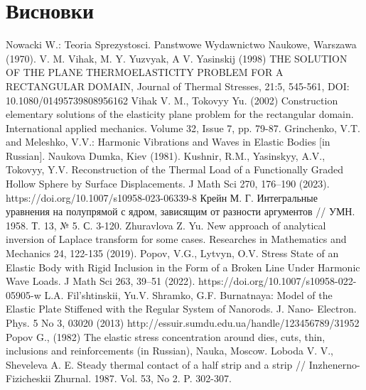 \documentclass[a4paper,14pt]{extarticle}
\numberwithin{equation}{section}
\begin{document}
\section*{\centering Висновки}

\newpage

\begin{thebibliography}{1}
    Nowacki W.: Teoria Sprezystosci. Panstwowe Wydawnictwo Naukowe, Warszawa (1970).
    V. M. Vihak, M. Y. Yuzvyak, A V. Yasinskij (1998) THE SOLUTION OF THE PLANE THERMOELASTICITY PROBLEM FOR A RECTANGULAR DOMAIN, Journal of Thermal Stresses, 21:5, 545-561, DOI: 10.1080/01495739808956162
    Vihak V. M., Tokovyy Yu. (2002) Construction elementary solutions of the elasticity plane problem for the rectangular domain. International applied mechanics. Volume 32, Issue 7, pp. 79-87.
    Grinchenko, V.T. and Meleshko, V.V.: Harmonic Vibrations and Waves in Elastic Bodies [in Russian]. Naukova Dumka, Kiev (1981).
    Kushnir, R.M., Yasinskyy, A.V., Tokovyy, Y.V. Reconstruction of the Thermal Load of a Functionally Graded Hollow Sphere by Surface Displacements. J Math Sci 270, 176–190 (2023). https://doi.org/10.1007/s10958-023-06339-8
    Крейн М. Г. Интегральные уравнения на полупрямой с ядром, зависящим от разности аргументов // УМН. 1958. Т. 13, № 5. С. 3-120.
    Zhuravlova Z. Yu. New approach of analytical inversion of Laplace transform for some cases. Researches in Mathematics and Mechanics 24, 122-135 (2019).
    Popov, V.G., Lytvyn, O.V. Stress State of an Elastic Body with Rigid Inclusion in the Form of a Broken Line Under Harmonic Wave Loads. J Math Sci 263, 39–51 (2022). https://doi.org/10.1007/s10958-022-05905-w
    L.A. Fil’shtinskii, Yu.V. Shramko, G.F. Burnatnaya: Model of the Elastic Plate Stiffened with the Regular System of Nanorods. J. Nano- Electron. Phys. 5 No 3, 03020 (2013) http://essuir.sumdu.edu.ua/handle/123456789/31952
    Popov G., (1982) The elastic stress concentration around dies, cuts, thin, inclusions and reinforcements (in Russian), Nauka, Moscow.
    Loboda V. V., Sheveleva A. E. Steady thermal contact of a half strip and a strip // Inzhenerno-Fizicheskii Zhurnal. 1987. Vol. 53, No 2. P. 302-307.



\end{thebibliography}
\end{document}
